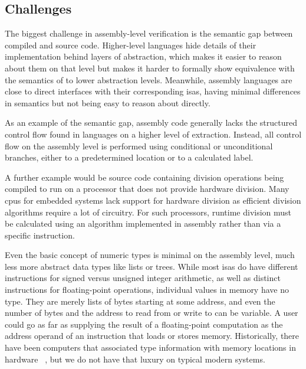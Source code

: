 \subsection{Challenges}
The biggest challenge in assembly-level verification is
the semantic gap between compiled and source code.
Higher-level languages hide details of their implementation
behind layers of abstraction, which makes it easier to reason about them on that level
but makes it harder to formally show equivalence with the semantics of
to lower abstraction levels.
Meanwhile, assembly languages are close to direct interfaces
with their corresponding \acp{isa},
having minimal differences in semantics but not being easy to reason about directly.

As an example of the semantic gap,
assembly code generally lacks the structured control flow found in languages
on a higher level of extraction.
Instead, all control flow on the assembly level is performed using conditional
or unconditional branches, either to a predetermined location
or to a calculated label.

A further example would be source code containing division operations
being compiled to run on a processor that does not provide hardware division.
Many \acp{cpu} for embedded systems lack support for hardware division
as efficient division algorithms require a lot of circuitry.
For such processors, runtime division must be calculated using an algorithm
implemented in assembly rather than via a specific instruction.

Even the basic concept of numeric types is minimal on the assembly level,
much less more abstract data types like lists or trees.
While most \acp{isa} do have different instructions
for signed versus unsigned integer arithmetic,
as well as distinct instructions for floating-point operations,
individual values in memory have no type.
They are merely lists of bytes starting at some address,
and even the number of bytes and the address to read from or write to can be variable.
A user could go as far as supplying the result of a floating-point computation
as the address operand of an instruction that loads or stores memory.
Historically, there have been computers that associated type information
with memory locations in hardware~%
\citep{feustel1972rice,feustel1973advantages,thornton2008rice},
but we do not have that luxury on typical modern systems.

